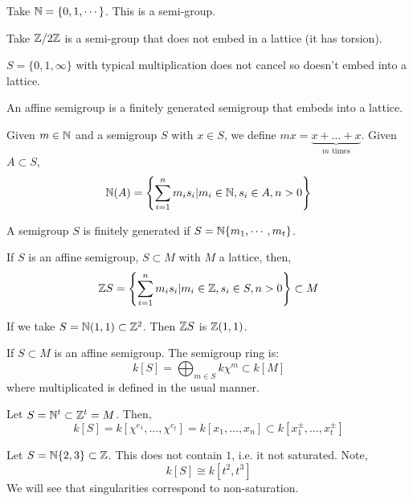 \documentclass[12pt]{amsart}
\begin{document}
\begin{example}
    Take $\mathbb N = \{0, 1, \cdots\}$. This is a semi-group. 
\end{example}

\begin{example}
    Take $\mathbb Z/2\mathbb Z$ is a semi-group that does not embed in a lattice (it has torsion). 
\end{example}

\begin{example}
    $S = \{0, 1, \infty\}$ with typical multiplication does not cancel so doesn't embed into a lattice. 
\end{example}

\begin{definition}
    An affine semigroup is a finitely generated semigroup that embeds into a lattice. 
\end{definition}

Given $m \in \mathbb N$ and a semigroup $S$ with $x \in S$, we define $mx = \underbrace{x+\ldots+x}_{m \text{ times}}$. Given $A \subset S$, 
\[ \mathbb N(A) = \left\{ \sum_{i=1}^n m_is_i | m_i \in \mathbb N, s_i \in A, n > 0 \right\}\]

\begin{definition}
    A semigroup $S$ is finitely generated if $S = \mathbb N\{m_1, \cdots, m_t\}$. 
\end{definition}

If $S$ is an affine semigroup, $S \subset M$ with $M$ a lattice, then, 
\[ \mathbb Z S = \left\{\sum_{i = 1}^n m_is_i | m_i \in \mathbb Z, s_i \in S, n > 0\right\} \subset M\]

\begin{example}
    If we take $S = \mathbb N(1,1) \subset \mathbb Z^2$. Then $\mathbb Z S$ is $\mathbb Z(1,1)$. 
\end{example}

\begin{definition}
    If $S \subset M$ is an affine semigroup. The semigroup ring is:
    \[ k[S] = \bigoplus_{m \in S} k\chi^m \subset k[M]\]
    where multiplicated is defined in the usual manner. 
\end{definition}

\begin{example}
    Let $S = \mathbb N^t \subset \mathbb Z^t = M$. Then, 
    \[ k[S] = k[\chi^{e_1}, \ldots, \chi^{e_t}] = k[x_1, \ldots, x_n] \subset k[x_1^\pm, \ldots, x_t^\pm ] \] 
\end{example}

\begin{example}
    Let $S = \mathbb N\{2, 3\} \subset \mathbb Z$. This does not contain $1$, i.e. it not saturated. Note, 
    \[ k[S] \cong k[t^2, t^3]\]
    We will see that singularities correspond to non-saturation. 
\end{example}
\end{document}
